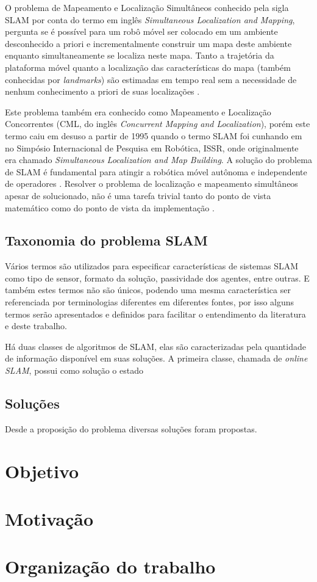 O problema de Mapeamento e Localização Simultâneos conhecido pela sigla SLAM por conta do termo em inglês \textit{Simultaneous Localization and Mapping}, pergunta se é possível para um robô móvel ser colocado em um ambiente desconhecido a priori e incrementalmente construir um mapa deste ambiente enquanto simultaneamente se localiza neste mapa. Tanto a trajetória da plataforma móvel quanto a localização das características do mapa (também conhecidas por \textit{landmarks}) são estimadas em tempo real sem a necessidade de nenhum conhecimento a priori de suas localizações \cite{durrant2006simultaneous}.

Este problema também era conhecido como Mapeamento e Localização Concorrentes (CML, do inglês \textit{Concurrent Mapping and Localization}), porém este termo caiu em desuso a partir de 1995 quando o termo SLAM foi cunhando em \cite{durrant1996localization} no Simpósio Internacional de Pesquisa em Robótica, ISSR, onde originalmente era chamado \textit{Simultaneous Localization and Map Building}. A solução do problema de SLAM é fundamental para atingir a robótica móvel autônoma e independente de operadores \cite{durrant2006simultaneous}. Resolver o problema de localização e mapeamento simultâneos apesar de solucionado, não é uma tarefa trivial tanto do ponto de vista matemático como do ponto de vista da implementação \cite{durrant1996localization}.

\subsection*{Taxonomia do problema SLAM}
Vários termos são utilizados para especificar características de sistemas SLAM como tipo de sensor, formato da solução, passividade dos agentes, entre outras. E também estes termos não são únicos, podendo uma mesma característica ser referenciada por terminologias diferentes em diferentes fontes, por isso alguns termos serão apresentados e definidos para facilitar o entendimento da literatura e deste trabalho.

Há duas classes de algoritmos de SLAM, elas são caracterizadas pela quantidade de informação disponível em suas soluções. A primeira classe, chamada de \textit{online SLAM}, possui como solução o estado 


\subsection*{Soluções}
Desde a proposição do problema diversas soluções foram propostas.

\section{Objetivo}

\section{Motivação}

\section{Organização do trabalho}
